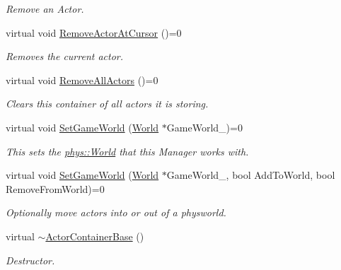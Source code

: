 \begin{DoxyCompactItemize}
\begin{DoxyCompactList}\small\item\em Remove an Actor. \item\end{DoxyCompactList}\item 
virtual void \hyperlink{classphys_1_1ActorContainerBase_a60f37a056e8750f3b389c5ceed14520c}{RemoveActorAtCursor} ()=0
\begin{DoxyCompactList}\small\item\em Removes the current actor. \item\end{DoxyCompactList}\item 
\hypertarget{classphys_1_1ActorContainerBase_abc75d53e24ca0d9c2d9dcd14f6107149}{
virtual void \hyperlink{classphys_1_1ActorContainerBase_abc75d53e24ca0d9c2d9dcd14f6107149}{RemoveAllActors} ()=0}
\label{classphys_1_1ActorContainerBase_abc75d53e24ca0d9c2d9dcd14f6107149}

\begin{DoxyCompactList}\small\item\em Clears this container of all actors it is storing. \item\end{DoxyCompactList}\item 
virtual void \hyperlink{classphys_1_1ActorContainerBase_ae0cb5c288f17507247dd98d3a2466876}{SetGameWorld} (\hyperlink{classphys_1_1World}{World} $\ast$GameWorld\_\-)=0
\begin{DoxyCompactList}\small\item\em This sets the \hyperlink{classphys_1_1World}{phys::World} that this Manager works with. \item\end{DoxyCompactList}\item 
virtual void \hyperlink{classphys_1_1ActorContainerBase_a366c1797bef08f3a1846bf010e2e2b04}{SetGameWorld} (\hyperlink{classphys_1_1World}{World} $\ast$GameWorld\_\-, bool AddToWorld, bool RemoveFromWorld)=0
\begin{DoxyCompactList}\small\item\em Optionally move actors into or out of a physworld. \item\end{DoxyCompactList}\item 
virtual \hyperlink{classphys_1_1ActorContainerBase_aa5eac062dd70a220a4ec6df973c6f258}{$\sim$ActorContainerBase} ()
\begin{DoxyCompactList}\small\item\em Destructor. \item\end{DoxyCompactList}\end{DoxyCompactItemize}
